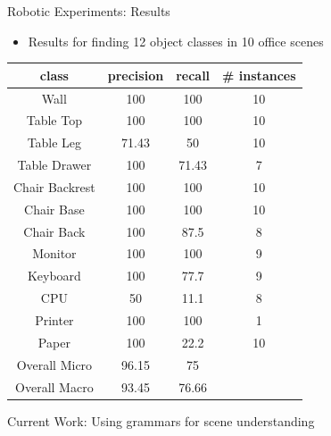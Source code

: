 \documentclass{beamer}
\begin{document}
\begin{frame}{Robotic Experiments: Results}

\begin{itemize}

\item Results for finding 12 object classes in 10 office scenes

\end{itemize}

\begin {center}
{\footnotesize 
\begin{tabular}{c | c | c | c}
class & precision & recall & \# instances\\
\hline
Wall  & 100 & 100 & 10\\
Table Top  & 100  &100 & 10 \\
Table Leg & 71.43 & 50 & 10 \\
Table Drawer & 100 & 71.43 & 7\\
Chair Backrest & 100 & 100 & 10 \\
Chair Base & 100  & 100 & 10 \\
Chair Back & 100 & 87.5 & 8 \\
Monitor & 100 & 100 & 9 \\
Keyboard & 100 & 77.7 & 9\\
CPU & 50 & 11.1 & 8 \\ 
Printer & 100 & 100 & 1\\
Paper & 100 & 22.2 & 10\\
\hline
Overall Micro & 96.15 & 75 \\
Overall Macro & 93.45 & 76.66 \\

\end{tabular}
}
\end{center}

\end{frame}

\begin{frame}{Current Work: Using grammars for scene understanding}


\end{frame}
\end{document}
